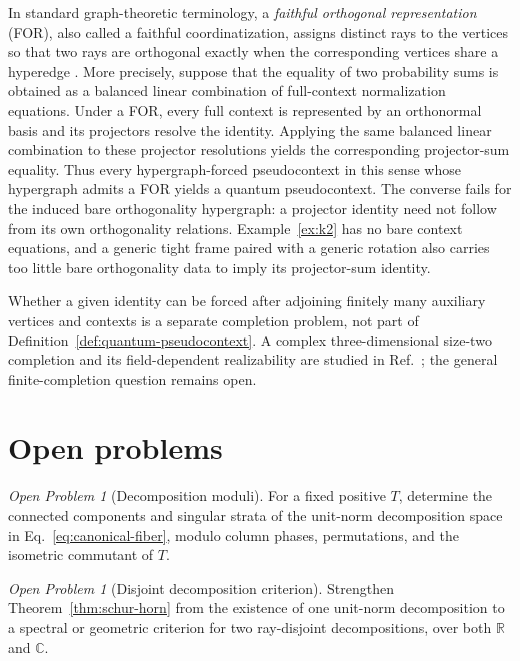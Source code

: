 \documentclass[
  twocolumn,
  aps,
  pra,
  floatfix,
  amsmath,amssymb,
  longbibliography
]{revtex4-2}
\theoremstyle{definition}
\theoremstyle{remark}
\newtheorem{problem}[theorem]{Open Problem}
\newcommand{\R}{\mathbb R}
\newcommand{\C}{\mathbb C}
\newcommand{\1}{\mathbf 1}
\begin{document}
In standard graph-theoretic terminology, a \emph{faithful orthogonal
representation} (FOR), also called a faithful coordinatization, assigns
distinct rays to the vertices so that two rays are orthogonal exactly when
the corresponding vertices share a hyperedge
\cite{lovasz-79,lovasz-89,Portillo-2015}.  More precisely, suppose that the
equality of two probability sums is obtained as a balanced linear combination
of full-context normalization equations.  Under a FOR, every full context is
represented by an orthonormal basis and its projectors resolve the identity.
Applying the same balanced linear combination to these projector resolutions
yields the corresponding projector-sum equality.  Thus every
hypergraph-forced pseudocontext in this sense whose hypergraph admits a FOR
yields a quantum pseudocontext.  The converse fails for the induced bare
orthogonality hypergraph: a projector identity need not follow from its own
orthogonality relations.  Example~\ref{ex:k2} has no bare context equations,
and a generic tight frame paired with a generic rotation also carries too
little bare orthogonality data to imply its projector-sum identity.

Whether a given identity can be forced after adjoining finitely many
auxiliary vertices and contexts is a separate completion problem, not part
of Definition~\ref{def:quantum-pseudocontext}.  A complex three-dimensional
size-two completion and its field-dependent realizability are studied in
Ref.~\cite{2026-Navara-Svozil-complex-only-3d-hypergraphs}; the general
finite-completion question remains open.

\section{Open problems}

\begin{problem}[Decomposition moduli]
For a fixed positive $T$, determine the connected components and singular
strata of the unit-norm decomposition space in
Eq.~\eqref{eq:canonical-fiber}, modulo column phases, permutations, and the
isometric commutant of $T$.
\end{problem}

\begin{problem}[Disjoint decomposition criterion]
Strengthen Theorem~\ref{thm:schur-horn} from the existence of one unit-norm
decomposition to a spectral or geometric criterion for two ray-disjoint
decompositions, over both $\R$ and $\C$.
\end{problem}
\end{document}
